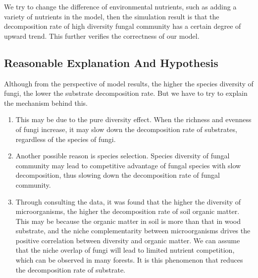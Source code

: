 \documentclass[12pt]{article}
\begin{document}
We try to change the difference of environmental nutrients, such as adding a variety of nutrients in the model, then the simulation result is that the decomposition rate of high diversity fungal community has a certain degree of upward trend. This further verifies the correctness of our model.\par 

\subsection{Reasonable Explanation And Hypothesis}

Although from the perspective of model results, the higher the species diversity of fungi, the lower the substrate decomposition rate. But we have to try to explain the mechanism behind this.\par 

\begin{enumerate}[\bfseries 1.]
	
	\item This may be due to the pure diversity effect. When the richness and evenness of fungi increase, it may slow down the decomposition rate of substrates, regardless of the species of fungi.\par 
	
	\item Another possible reason is species selection. Species diversity of fungal community may lead to competitive advantage of fungal species with slow decomposition, thus slowing down the decomposition rate of fungal community.\par 
	
	\item Through consulting the data, it was found that the higher the diversity of microorganisms, the higher the decomposition rate of soil organic matter\cite{8,9}. This may be because the organic matter in soil is more than that in wood substrate, and the niche complementarity between microorganisms drives the positive correlation between diversity and organic matter. We can assume that the niche overlap of fungi will lead to limited nutrient competition, which can be observed in many forests\cite{10}. It is this phenomenon that reduces the decomposition rate of substrate.\par 
	
\end{enumerate}\par


\end{document}
